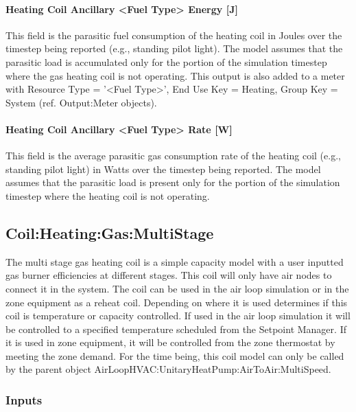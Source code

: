 \paragraph{Heating Coil Ancillary <Fuel Type> Energy {[}J{]}}\label{heating-coil-ancillary-gas-energy-j}

This field is the parasitic fuel consumption of the heating coil in Joules over the timestep being reported (e.g., standing pilot light). The model assumes that the parasitic load is accumulated only for the portion of the simulation timestep where the gas heating coil is not operating. This output is also added to a meter with Resource Type = '<Fuel Type>', End Use Key = Heating, Group Key = System (ref. Output:Meter objects).

\paragraph{Heating Coil Ancillary <Fuel Type> Rate {[}W{]}}\label{heating-coil-ancillary-gas-rate-w}

This field is the average parasitic gas consumption rate of the heating coil (e.g., standing pilot light) in Watts over the timestep being reported. The model assumes that the parasitic load is present only for the portion of the simulation timestep where the heating coil is not operating.

\subsection{Coil:Heating:Gas:MultiStage}\label{coilheatinggasmultistage}

The multi stage gas heating coil is a simple capacity model with a user inputted gas burner efficiencies at different stages. This coil will only have air nodes to connect it in the system. The coil can be used in the air loop simulation or in the zone equipment as a reheat coil. Depending on where it is used determines if this coil is temperature or capacity controlled. If used in the air loop simulation it will be controlled to a specified temperature scheduled from the Setpoint Manager. If it is used in zone equipment, it will be controlled from the zone thermostat by meeting the zone demand. For the time being, this coil model can only be called by the parent object AirLoopHVAC:UnitaryHeatPump:AirToAir:MultiSpeed.

\subsubsection{Inputs}\label{inputs-11-005}

